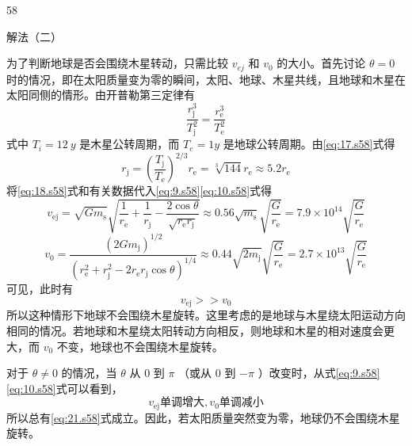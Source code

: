 \begin{solution}{58}
\begin{subsolution}
        解法（二）

        为了判断地球是否会围绕木星转动，只需比较 $v_{ej}$ 和 $v_{0}$ 的大小。首先讨论 $\theta=0$ 时的情况，即在太阳质量变为零的瞬间，太阳、地球、木星共线，且地球和木星在太阳同侧的情形。由开普勒第三定律有
        \begin{equation}
            \frac {r _ {\mathrm{j}}^{3}}{T _ {\mathrm{j}}^{2}} = \frac {r _ {\mathrm{e}}^{3}}{T _ {\mathrm{e}}^{2}}
            \label{eq:17.s58}
        \end{equation}
        式中 $T_{i}=12\ y$ 是木星公转周期，而 $T_{e}=1y$ 是地球公转周期。由\eqref{eq:17.s58}式得
        \begin{equation}
            r _ {\mathrm{j}} = \left(\frac {T _ {\mathrm{j}}}{T _ {\mathrm{e}}}\right)^{2 / 3} r _ {\mathrm{e}} = \sqrt[3]{144} r _ {\mathrm{e}} \approx 5.2 r _ {\mathrm{e}}
            \label{eq:18.s58}
        \end{equation}
        将\eqref{eq:18.s58}式和有关数据代入\eqref{eq:9.s58}\eqref{eq:10.s58}式得
        \begin{equation}
            v _ {\mathrm{ej}} = \sqrt {G m _ {\mathrm{s}}} \sqrt {\frac {1}{r _ {\mathrm{e}}} + \frac {1}{r _ {\mathrm{j}}} - \frac {2 \cos \theta}{\sqrt {r _ {\mathrm{e}} r _ {\mathrm{j}}}}} \approx 0.56 \sqrt {m _ {\mathrm{s}}} \sqrt {\frac {G}{r _ {\mathrm{e}}}} = 7.9 \times 10^{14} \sqrt {\frac {G}{r _ {\mathrm{e}}}}
            \label{eq:19.s58}
        \end{equation}
        \begin{equation}
            v _ {0} = \frac {\left(2 G m _ {\mathrm{j}}\right)^{1 / 2}}{\left(r _ {\mathrm{e}}^{2} + r _ {\mathrm{j}}^{2} - 2 r _ {\mathrm{e}} r _ {\mathrm{j}} \cos \theta\right)^{1 / 4}} \approx 0.44 \sqrt {2 m _ {\mathrm{j}}} \sqrt {\frac {G}{r _ {\mathrm{e}}}} = 2.7 \times 10^{13} \sqrt {\frac {G}{r _ {\mathrm{e}}}}
            \label{eq:20.s58}
        \end{equation}
        可见，此时有
        \begin{equation}
            v _ {\mathrm{ej}} >> v _ {0}
            \label{eq:21.s58}
        \end{equation}
        所以这种情形下地球不会围绕木星旋转。这里考虑的是地球与木星绕太阳运动方向相同的情况。若地球和木星绕太阳转动方向相反，则地球和木星的相对速度会更大，而 $v_{0}$ 不变，地球也不会围绕木星旋转。

        对于 $\theta \neq 0$ 的情况，当 $\theta$ 从 0 到 $\pi$ （或从 0 到 $-\pi$ ）改变时，从式\eqref{eq:9.s58}\eqref{eq:10.s58}式可以看到，
        \begin{equation}
            v _ {\mathrm{ej}} \text{单调增大}, v _ {0} \text{单调减小}
            \label{eq:22.s58}
        \end{equation}
        所以总有\eqref{eq:21.s58}式成立。因此，若太阳质量突然变为零，地球仍不会围绕木星旋转。
    \end{subsolution}
\end{solution}